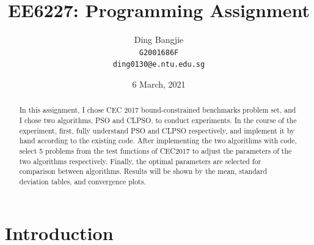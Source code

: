 \documentclass[letterpaper,12pt]{article}
\begin{document}
\title{EE6227: Programming Assignment \uppercase\expandafter{}}
\author{Ding Bangjie \\{\tt G2001686F}  \\{\tt ding0130@e.ntu.edu.sg}}

\date{6 March, 2021}
\maketitle

\begin{abstract}
In this assignment, I chose CEC 2017 bound-constrained benchmarks problem set, and I chose two algorithms, PSO and CLPSO, to conduct experiments. In the course of the experiment, first, fully understand PSO and CLPSO respectively, and implement it by hand according to the existing code. After implementing the two algorithms with code, select 5 problems from the test functions of CEC2017 to adjust the parameters of the two algorithms respectively. Finally, the optimal parameters are selected for comparison between algorithms. Results will be shown by the mean, standard deviation tables, and convergence plots.
\end{abstract}


\section{Introduction}
\end{document}
